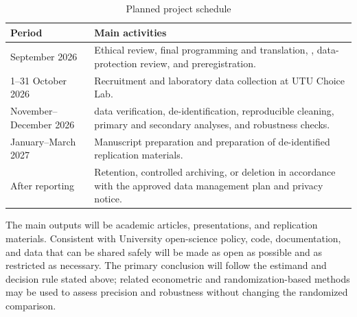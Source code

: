 \documentclass[11pt,a4paper]{article}
\begin{document}
\begin{table}[H]
\centering
\caption{Planned project schedule}
\begin{tabularx}{0.92\textwidth}{@{}L{0.24\textwidth}X@{}}
\toprule
Period & Main activities \\
\midrule
September 2026 & Ethical review, final programming and translation, , data-protection review, and preregistration. \\
1--31 October 2026 & Recruitment and laboratory data collection at UTU Choice Lab. \\
November--December 2026 &  data verification, de-identification, reproducible cleaning, primary and secondary analyses, and robustness checks. \\
January--March 2027 & Manuscript preparation and preparation of de-identified replication materials. \\
After reporting & Retention, controlled archiving, or deletion in accordance with the approved data management plan and privacy notice. \\
\bottomrule
\end{tabularx}
\end{table}

The main outputs will be academic articles, presentations, and replication materials. Consistent with University open-science policy, code, documentation, and data that can be shared safely will be made as open as possible and as restricted as necessary. The primary conclusion will follow the estimand and decision rule stated above; related econometric and randomization-based methods may be used to assess precision and robustness without changing the randomized comparison.

\printbibliography
\end{document}
